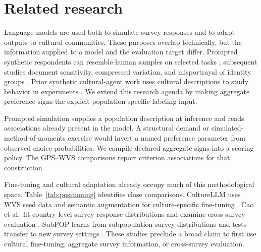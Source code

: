 \section{Related research}\label{sec:litreview}
Language models are used both to simulate survey responses and to adapt outputs to cultural communities. These purposes overlap technically, but the information supplied to a model and the evaluation target differ. Prompted synthetic respondents can resemble human samples on selected tasks \cite{argyle2023,horton2023}; subsequent studies document sensitivity, compressed variation, and misportrayal of identity groups \cite{bisbee2024,boelaert2025,wang2025}. Prior synthetic cultural-agent work uses cultural descriptions to study behavior in experiments \cite{capra2025}. We extend this research agenda by making aggregate preference signs the explicit population-specific labeling input.

Prompted simulation supplies a population description at inference and reads associations already present in the model. A structural demand or simulated-method-of-moments exercise would invert a named preference parameter from observed choice probabilities. We compile declared aggregate signs into a scoring policy. The GPS--WVS comparisons report criterion associations for that construction.

Fine-tuning and cultural adaptation already occupy much of this methodological space. Table~\ref{tab:positioning} identifies close comparisons. CultureLLM uses WVS seed data and semantic augmentation for culture-specific fine-tuning \cite{li2024culture}. Cao et al.\ fit country-level survey response distributions and examine cross-survey evaluation \cite{cao2025}. SubPOP learns from subpopulation survey distributions and tests transfer to new survey settings \cite{suh2025}. These studies preclude a broad claim to first use cultural fine-tuning, aggregate survey information, or cross-survey evaluation.

